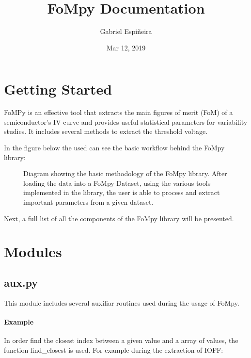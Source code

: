 \documentclass[letterpaper,10pt,english,openany, oneside]{sphinxmanual}
\title{FoMpy Documentation}
\date{Mar 12, 2019}
\author{Gabriel Espiñeira}
\let\sphinxpxdimen\pdfpxdimen\else\newdimen\sphinxpxdimen
\begin{document}
\pagestyle{empty}
\maketitle
\pagestyle{plain}
\sphinxtableofcontents
\pagestyle{normal}
\label{\detokenize{index::doc}}



\chapter{Getting Started}
\label{\detokenize{index:getting-started}}
FoMPy is an effective tool that extracts the main figures of merit (FoM) of a semiconductor’s IV curve and provides useful statistical parameters for variability studies. It includes several methods to extract the threshold voltage.

In the figure below the used can see the basic workflow behind the FoMpy library:

\begin{figure}[htbp]
\centering
\capstart

\noindent\sphinxincludegraphics[width=600\sphinxpxdimen,height=400\sphinxpxdimen]{{simplified_diagram}.jpg}
\caption{Diagram showing the basic methodology of the FoMpy library. After loading the data into a FoMpy Dataset, using the various tools implemented in the library, the user is able to process and extract important parameters from a given dataset.}\label{\detokenize{index:id1}}\end{figure}

Next, a full list of all the components of the FoMpy library will be presented.


\chapter{Modules}
\label{\detokenize{index:module-fompy.aux}}\label{\detokenize{index:modules}}

\section{aux.py}
\label{\detokenize{index:aux-py}}
This module includes several auxiliar routines used during the usage of FoMpy.
\subsubsection*{Example}

In order find the closest index between a given value and a array of values, the function
find\_closest is used. For example during the extraction of IOFF:
\end{document}
